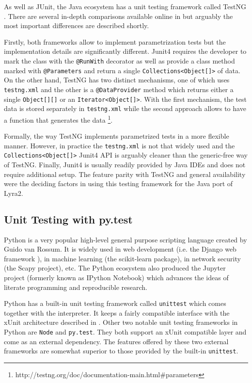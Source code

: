 As well as JUnit, the Java ecosystem has a unit testing framework called TestNG \cite{testng:2017:home}. There are several in-depth comparisons available online in \cite{mkyong:2017:testng-vs-junit, wiki:2017:testng-vs-junit} but arguably the most important differences are described shortly.

Firstly, both frameworks allow to implement parametrization tests but the implementation details are significantly different. Junit4 requires the developer to mark the class with the \texttt{@RunWith} decorator as well as provide a class method marked with \texttt{@Parameters} and return a single \texttt{Collections<Object[]>} of data. On the other hand, TestNG has two distinct mechanisms, one of which uses \texttt{testng.xml} and the other is a \texttt{@DataProvider} method which returns either a single \texttt{Object[][]} or an \texttt{Iterator<Object[]>}. With the first mechanism, the test data is stored separately in \texttt{testng.xml} while the second approach allows to have a function that generates the data \footnote{http://testng.org/doc/documentation-main.html\#parameters}.

Formally, the way TestNG implements parametrized tests in a more flexible manner. However, in practice the \texttt{testng.xml} is not that widely used and the \texttt{Collections<Object[]>} Junit4 API is arguably cleaner than the generic-free way of TestNG. Finally, Junit4 is usually readily provided by Java IDEs and does not require additional setup. The feature parity with TestNG and general availability were the deciding factors in using this testing framework for the Java port of Lyra2.

\subsection{Unit Testing with py.test}
\label{sec:unit-pytest}

Python is a very popular high-level general purpose scripting language created by Guido van Rossum. It is widely used in web development (i.e. the Django web framework \cite{django:2017:homepage}), in machine learning (the scikit-learn package), in network security (the Scapy project), etc. The Python ecosystem also produced the Jupyter project (formerly known as IPython Notebook) which advances the ideas of literate programming and reproducible research.

Python has a built-in unit testing framework called \texttt{unittest} which comes together with the interpreter. It keeps a fairly compatible interface with the xUnit architecture described in \cite{sec:unit-junit-testng}. Other two notable unit testing frameworks in Python are \texttt{Node} and \texttt{py.test}. They both support an xUnit compatible layer and come as an external dependency. The features offered by these two external frameworks are somewhat superior to those provided by the built-in \texttt{unittest}.


